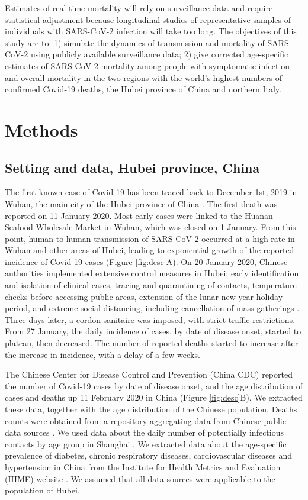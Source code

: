 \documentclass{article}
\begin{document}
Estimates of real time mortality will rely on surveillance data and require statistical adjustment because longitudinal studies of representative samples of individuals with SARS-CoV-2 infection will take too long. 
The objectives of this study are to: 1) simulate the dynamics of transmission and mortality of SARS-CoV-2 using publicly available surveillance data; 2) give corrected age-specific estimates of SARS-CoV-2 mortality among people with symptomatic infection and overall mortality in the two regions with the world’s highest numbers of confirmed Covid-19 deaths, the Hubei province of China and northern Italy. 


\section*{Methods}

\subsection*{Setting and data, Hubei province, China}

The first known case of Covid-19 has been traced back to December 1st, 2019 in Wuhan, the main city of the Hubei province of China \cite{huang2020clinical}.
The first death was reported on 11 January 2020.
Most early cases were linked to the Huanan Seafood Wholesale Market in Wuhan, which was closed on 1 January.
From this point, human-to-human transmission of SARS-CoV-2 occurred at a high rate in Wuhan and other areas of Hubei, leading to exponential growth of the reported incidence of Covid-19 cases (Figure \ref{fig:desc}A). 
On 20 January 2020, Chinese authorities implemented extensive control measures in Hubei: early identification and isolation of clinical cases, tracing and quarantining of contacts, temperature checks before accessing public areas, extension of the lunar new year holiday period, and extreme social distancing, including cancellation of mass gatherings  \cite{jointmission}. 
Three days later, a cordon sanitaire was imposed, with strict traffic restrictions. 
From 27 January, the daily incidence of cases, by date of disease onset, started to plateau, then decreased. 
The number of reported deaths started to increase after the increase in incidence, with a delay of a few weeks.

The Chinese Center for Disease Control and Prevention (China CDC) reported the number of Covid-19 cases by date of disease onset, and the age distribution of cases and deaths up 11 February 2020 in China (Figure \ref{fig:desc}B). 
We extracted these data, together with the age distribution of the Chinese population. 
Deaths counts were obtained from a repository aggregating data from Chinese public data sources \cite{nCov2019}.
We used data about the daily number of potentially infectious contacts by age group in Shanghai \cite{zhang2019patterns}. 
We extracted data about the age-specific prevalence of diabetes, chronic respiratory diseases, cardiovascular diseases and hypertension in China from the Institute for Health Metrics and Evaluation (IHME) website \cite{ihme}. 
We assumed that all data sources were applicable to the population of Hubei.
\end{document}
